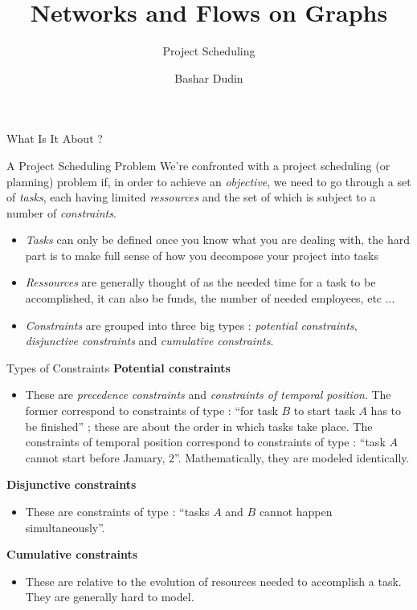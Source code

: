 \documentclass[32pt,aspectratio=169]{beamer}
\author[BD]{Bashar Dudin}
\institute[]{EPITA}
\title{Networks and Flows on Graphs} %
\subtitle{Project Scheduling}
\begin{document}
\begin{frame}[plain]
\titlepage %
\end{frame}

\begin{frame}{What Is It About ?}
  \begin{halfshyblock}{A Project Scheduling Problem}
    We're confronted with a project scheduling (or planning) problem
    if, in order to achieve an \emph{objective}, we need to go through
    a set of \emph{tasks}, each having limited \emph{ressources} and
    the set of which is subject to a number of \emph{constraints}.
  \end{halfshyblock}
  \pause
  \begin{itemize}
  \item \emph{Tasks} can only be defined once you know what you are
    dealing with, the hard part is to make full sense of how you
    decompose your project into tasks
  \item \emph{Ressources} are generally thought of as the needed time
    for a task to be accomplished, it can also be funds, the number of
    needed employees, etc ...
  \item \emph{Constraints} are grouped into three big types :
    \emph{potential constraints}, \emph{disjunctive constraints} and
    \emph{cumulative constraints}. 
  \end{itemize}
\end{frame}

\begin{frame}{Types of Constraints}
  \textbf{Potential constraints}
  \begin{paremph}
    \begin{itemize}
    \item[] These are \emph{precedence constraints} and
      \emph{constraints of temporal position}. The former correspond
      to constraints of type : ``for task $B$ to start task $A$ has to
      be finished'' ; these are about the order
      in which tasks take place. The constraints of temporal position
      correspond to constraints of type : ``task $A$ cannot start
      before January, $2$''. Mathematically, they are modeled
      identically.
    \end{itemize}
  \end{paremph}
  \textbf{Disjunctive constraints}
  \begin{paremph}
    \begin{itemize}
    \item[] These are constraints of type : ``tasks $A$ and $B$ cannot
      happen simultaneously''.
    \end{itemize}
  \end{paremph}
  \textbf{Cumulative constraints}
  \begin{paremph}
    \begin{itemize}
    \item[] These are relative to the evolution
        of resources needed to accomplish a task. They are generally
        hard to model.
      \end{itemize}
  \end{paremph}
\end{frame}
\end{document}
